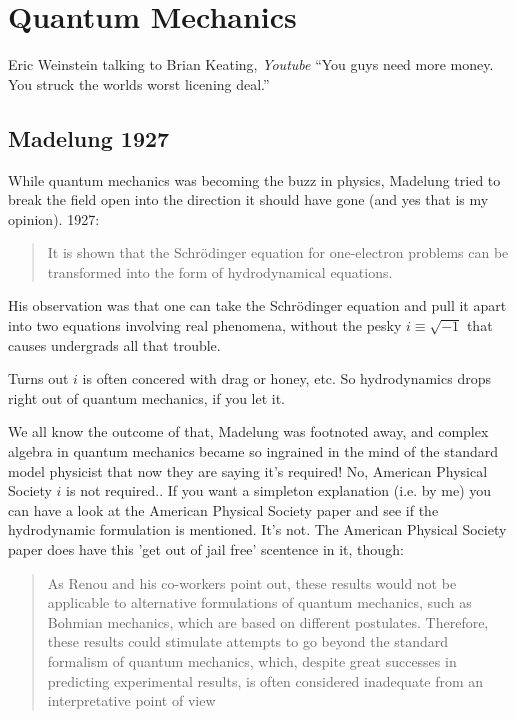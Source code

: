 \documentclass[../rzero]{subfiles}
\begin{document}
\chapter{Quantum Mechanics}\label{quantumMechanicsChapter}

\begin{chapquote}{Eric Weinstein talking to Brian Keating, \textit{Youtube\cite{drbriankeatingEricWeinsteinTheoretical2020}}}
``You guys need more money. You struck the worlds worst licening deal.''
\end{chapquote}

\section{Madelung 1927}
While quantum mechanics was becoming the buzz in physics, Madelung\cite{E.Madelung1927} tried to break the field open into the direction it should have gone (and yes that is my opinion). 1927:
\begin{quotation}
	It is shown that the Schrödinger equation for one-electron problems can be transformed into the form of hydrodynamical equations.
\end{quotation}

His observation was that one can take the Schrödinger equation and pull it apart into two equations involving real phenomena, without the pesky $i \equiv \sqrt{-1}$ that causes undergrads all that trouble. 

Turns out $i$ is often concered with drag or honey, etc. So hydrodynamics drops right out of quantum mechanics, if you let it.  

We all know the outcome of that, Madelung was footnoted away, and complex algebra in quantum mechanics became so ingrained in the mind of the standard model physicist\cite{NotYourStandard} that now they are saying it's required!\cite{avellaQuantumMechanicsMust2022} No, American Physical Society $i$ is not required.\cite{mckagueSimulatingQuantumSystems2008}. If you want a simpleton explanation (i.e. by me) you can have a look at the American Physical Society paper and see if the hydrodynamic formulation is mentioned. It's not. The American Physical Society paper does have this 'get out of jail free' scentence in it, though: 

\begin{quotation}
	As Renou and his co-workers point out, these results would not be applicable to alternative formulations of quantum mechanics, such as Bohmian mechanics, which are based on different postulates. Therefore, these results could stimulate attempts to go beyond the standard formalism of quantum mechanics, which, despite great successes in predicting experimental results, is often considered inadequate from an interpretative point of view
\end{quotation} 
\end{document}
